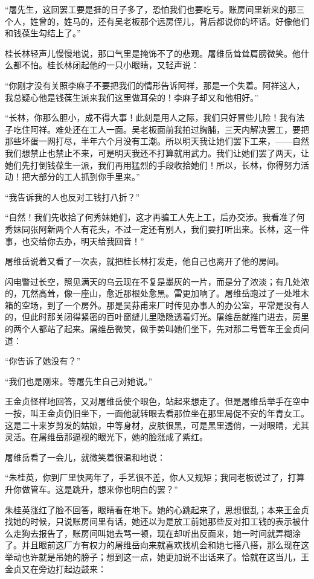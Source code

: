 \par “屠先生，这回罢工要是捱的日子多了，恐怕我们也要吃亏。账房间里新来的那三个人，姓曾的，姓马的，还有吴老板那个远房侄儿，背后都说你的坏话。好像他们和钱葆生勾结上了。”
\par 桂长林轻声儿慢慢地说，那口气里是掩饰不了的悲观。屠维岳耸耸肩膀微笑。他什么都不怕。桂长林闭起他的一只小眼睛，又轻声说：
\par “你刚才没有关照李麻子不要把我们的情形告诉阿祥，那是一个失着。阿祥这人，我总疑心他是钱葆生派来我们这里做耳朵的！李麻子却又和他相好。”
\par “长林，你那么胆小，成不得大事！此刻是用人之际，我们只好冒些儿险！我有法子吃住阿祥。难处还在工人一面。吴老板面前我拍过胸脯，三天内解决罢工，要把那些坏蛋一网打尽，半年六个月没有工潮。所以明天我让她们罢下工来，——自然我们想禁止也禁止不来，可是明天我还不打算就用武力。我们让她们罢了两天，让她们先打倒钱葆生一派，我们再用猛烈的手段收拾她们！所以，长林，你得努力活动！把大部分的工人抓到你手里来。”
\par “我告诉我的人也反对工钱打八折？”
\par “自然！我们先收拾了何秀妹她们，这才再骗工人先上工，后办交涉。我看准了何秀妹同张阿新两个人有花头，不过一定还有别人，我们要打听出来。长林，这一件事，也交给你去办，明天给我回音！”
\par 屠维岳说着又看了一次表，就把桂长林打发走，他自己也离开了他的房间。
\par 闪电瞥过长空，照见满天的乌云现在不复是墨灰的一片，而是分了浓淡；有几处浓的，兀然高耸，像一座山，愈近那根处愈黑。雷更加响了。屠维岳跑过了一处堆木箱的空场，到了一个房外。那是吴荪甫来厂时传见办事人的办公室，平常是没有人的，但此时那关闭得紧密的百叶窗缝儿里隐隐透着灯光。屠维岳就推门进去，房里的两个人都站了起来。屠维岳微笑，做手势叫她们坐下，先对那二号管车王金贞问道：
\par “你告诉了她没有？”
\par “我们也是刚来。等屠先生自己对她说。”
\par 王金贞怪样地回答，又对屠维岳使个眼色，站起来想走了。但是屠维岳举手在空中一按，叫王金贞仍旧坐下，一面他就转眼去看那位坐在那里局促不安的年青女工。这是二十来岁剪发的姑娘，中等身材，皮肤很黑，可是黑里透俏，一对眼睛，尤其灵活。在屠维岳那逼视的眼光下，她的脸涨成了紫红。
\par 屠维岳看了一会儿，就微笑着很温和地说：
\par “朱桂英，你到厂里快两年了，手艺很不差，你人又规矩；我同老板说过了，打算升你做管车。这是跳升，想来你也明白的罢？”
\par 朱桂英涨红了脸不回答，眼睛看在地下。她的心跳起来了，思想很乱；本来王金贞找她的时候，只说账房间里有话，她还以为是放工前她那些反对扣工钱的表示被什么走狗去报告了，账房间叫她去骂一顿，现在却听出反面来，她一时间就弄糊涂了。并且眼前这厂方有权力的屠维岳向来就喜欢找机会和她七搭八搭，那么现在这举动也许就是吊她的膀子；想到这一点，她更加说不出话来了。恰就在这当儿，王金贞又在旁边打起边鼓来：
